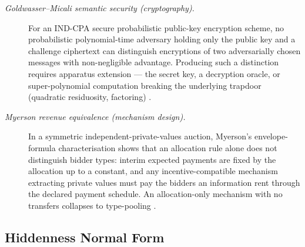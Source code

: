 \documentclass[11pt]{article}
\theoremstyle{definition}
\begin{document}
\begin{description}
\item[\emph{Goldwasser--Micali semantic security (cryptography).}]
For an IND-CPA secure probabilistic public-key encryption scheme,
no probabilistic polynomial-time adversary holding only the public
key and a challenge ciphertext can distinguish encryptions of two
adversarially chosen messages with non-negligible advantage.
Producing such a distinction requires apparatus extension --- the
secret key, a decryption oracle, or super-polynomial computation
breaking the underlying trapdoor (quadratic residuosity, factoring)
\citep{GoldwasserMicali1984ProbabilisticEncryption}.

\item[\emph{Myerson revenue equivalence (mechanism design).}]
In a symmetric independent-private-values auction, Myerson's
envelope-formula characterisation shows that an allocation rule
alone does not distinguish bidder types: interim expected payments
are fixed by the allocation up to a constant, and any
incentive-compatible mechanism extracting private values must pay
the bidders an information rent through the declared payment
schedule.  An allocation-only mechanism with no transfers collapses
to type-pooling
\citep{Myerson1981OptimalAuctionDesign}.
\end{description}

\subsection{Hiddenness Normal Form}\label{sec:access:hiddenness}
\end{document}
